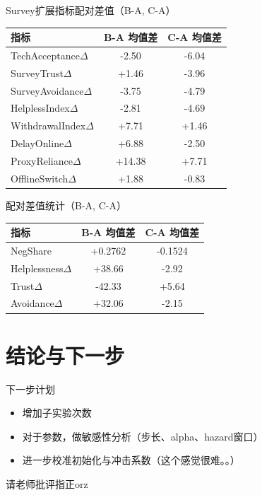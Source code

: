 \documentclass[aspectratio=169]{beamer}
\begin{document}
\begin{frame}{Survey扩展指标配对差值（B-A, C-A）}
    \begin{center}
        \scriptsize
        \begin{tabular}{lcc}
            \toprule
            指标 & B-A 均值差 & C-A 均值差 \\
            \midrule
            TechAcceptance\(\Delta\) & -2.50 & -6.04 \\
            SurveyTrust\(\Delta\) & +1.46 & -3.96 \\
            SurveyAvoidance\(\Delta\) & -3.75 & -4.79 \\
            HelplessIndex\(\Delta\) & -2.81 & -4.69 \\
            WithdrawalIndex\(\Delta\) & +7.71 & +1.46 \\
            DelayOnline\(\Delta\) & +6.88 & -2.50 \\
            ProxyReliance\(\Delta\) & +14.38 & +7.71 \\
            OfflineSwitch\(\Delta\) & +1.88 & -0.83 \\
            \bottomrule
        \end{tabular}
    \end{center}
\end{frame}



\begin{frame}{配对差值统计（B-A, C-A）}
    \begin{center}
        \small
        \begin{tabular}{lcc}
            \toprule
            指标 & B-A 均值差 & C-A 均值差 \\
            \midrule
            NegShare & +0.2762 & -0.1524 \\
            Helplessness\(\Delta\) & +38.66 & -2.92 \\
            Trust\(\Delta\) & -42.33 & +5.64 \\
            Avoidance\(\Delta\) & +32.06 & -2.15 \\
            \bottomrule
        \end{tabular}
    \end{center}
    \vspace{0.2cm}
\end{frame}

\section{结论与下一步}


\begin{frame}{下一步计划}
    \begin{itemize}
        \item 增加子实验次数
        \item 对于参数，做敏感性分析（步长、alpha、hazard窗口）
        \item 进一步校准初始化与冲击系数（这个感觉很难。。）
    \end{itemize}
\end{frame}

\begin{frame}
    \centering
    \Huge{请老师批评指正orz}
\end{frame}
\end{document}
